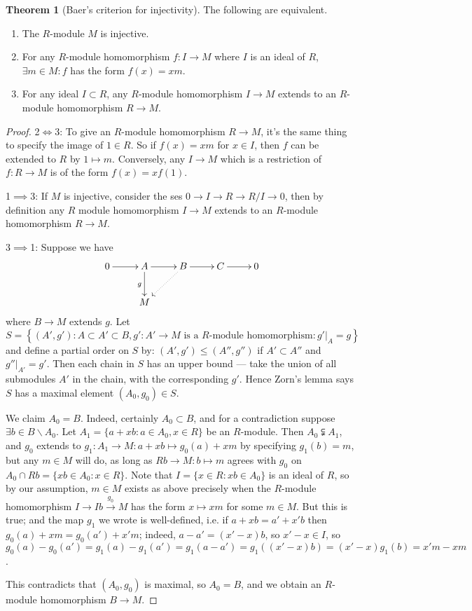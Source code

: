 \documentclass{article}
\theoremstyle{definition}
\newtheorem{thm}[defn]{Theorem}
\begin{document}
\begin{thm}[Baer's criterion for injectivity]
\label{thm:baer}
The following are equivalent.
\begin{enumerate}
\item The $R$-module $M$ is injective.
\item For any $R$-module homomorphism $f:I\rightarrow M$ where $I$ is an ideal of $R$, $\exists m\in M:f$ has the form $f(x)=xm$.
\item For any ideal $I\subset R$, any $R$-module homomorphism $I\rightarrow M$ extends to an $R$-module homomorphism $R\rightarrow M$.
\end{enumerate}
\end{thm}
\begin{proof}
2$\iff$3: To give an $R$-module homomorphism $R\rightarrow M$, it's the same thing to specify the image of $1\in R$. So if $f(x)=xm$ for $x\in I$, then $f$ can be extended to $R$ by $1\mapsto m$. Conversely, any $I\rightarrow M$ which is a restriction of $f:R\rightarrow M$ is of the form $f(x)=xf(1)$.

1$\implies$3: If $M$ is injective, consider the ses $0\rightarrow I\rightarrow R\rightarrow R/I\rightarrow 0$, then by definition any $R$ module homomorphism $I\rightarrow M$ extends to an $R$-module homomorphism $R\rightarrow M$.

3$\implies$1: Suppose we have
\[
\xymatrix{
0\ar[r] & A\ar[r]\ar[d]_g & B\ar[r]\ar@{.>}[dl] & C\ar[r] & 0 \\
& M
}
\]
where $B\rightarrow M$ extends $g$. Let
\[
S=\left\{(A',g'):A\subset A'\subset B,g':A'\rightarrow M\text{ is a }R\text{-module homomorphism}:\left. g'\right|_A=g\right\}
\]
and define a partial order on $S$ by: $(A',g')\leq (A'',g'')$ if $A'\subset A''$ and $\left. g''\right|_{A'}=g'$. Then each chain in $S$ has an upper bound --- take the union of all submodules $A'$ in the chain, with the corresponding $g'$. Hence Zorn's lemma says $S$ has a maximal element $(A_0,g_0)\in S$.

We claim $A_0=B$. Indeed, certainly $A_0\subset B$, and for a contradiction suppose $\exists b\in B\backslash A_0$. Let $A_1=\{a+xb:a\in A_0,x\in R\}$ be an $R$-module. Then $A_0\subsetneqq A_1$, and $g_0$ extends to $g_1:A_1\rightarrow M:a+xb\mapsto g_0(a)+xm$ by specifying $g_1(b)=m$, but any $m\in M$ will do, as long as $Rb\rightarrow M:b\mapsto m$ agrees with $g_0$ on $A_0\cap Rb=\{xb\in A_0:x\in R\}$. Note that $I=\{x\in R:xb\in A_0\}$ is an ideal of $R$, so by our assumption, $m\in M$ exists as above precisely when the $R$-module homomorphism $I\rightarrow Ib\xrightarrow{g_0} M$ has the form $x\mapsto xm$ for some $m\in M$. But this is true; and the map $g_1$ we wrote is well-defined, i.e. if $a+xb=a'+x'b$ then $g_0(a)+xm=g_0(a')+x'm$; indeed, $a-a'=(x'-x)b$, so $x'-x\in I$, so $g_0(a)-g_0(a')=g_1(a)-g_1(a')=g_1(a-a')=g_1((x'-x)b)=(x'-x)g_1(b)=x'm-xm$.

This contradicts that $(A_0,g_0)$ is maximal, so $A_0=B$, and we obtain an $R$-module homomorphism $B\rightarrow M$.
\end{proof}
\end{document}
